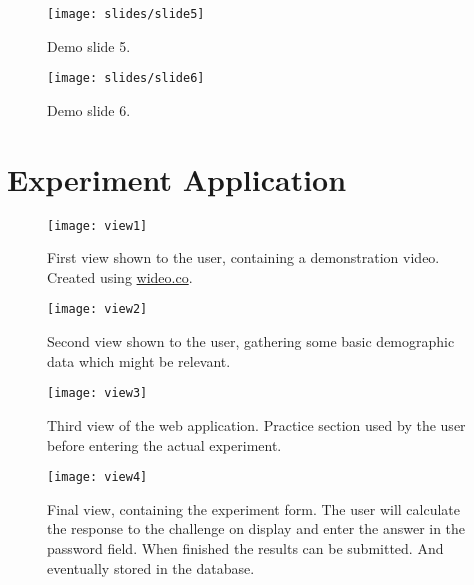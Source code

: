 \begin{figure}
    \texttt{[image: slides/slide5]}
    \caption{Demo slide 5.}
    \label{slide5}
\end{figure}


\begin{figure}
    \texttt{[image: slides/slide6]}
    \caption{Demo slide 6.}
    \label{slide6}
\end{figure}

\cleardoublepage




\chapter{Experiment Application}\label{experiment-views}

\begin{figure}
    \texttt{[image: view1]}
    \caption{First view shown to the user, containing a demonstration video. Created using \url{wideo.co}.}
    \label{view1}
\end{figure}

\begin{figure}
    \texttt{[image: view2]}
    \caption{Second view shown to the user, gathering some basic demographic data which might be relevant. }
    \label{view2}
\end{figure}

\begin{figure}
    \texttt{[image: view3]}
    \caption{Third view of the web application. Practice section used by the user before entering the actual experiment.}
    \label{view3}
\end{figure}

\begin{figure}
    \texttt{[image: view4]}
    \caption{Final view, containing the experiment form. The user will calculate the response to the challenge on display and enter the answer in the password field. When finished the results can be submitted. And eventually stored in the database.}
    \label{view4}
\end{figure}
